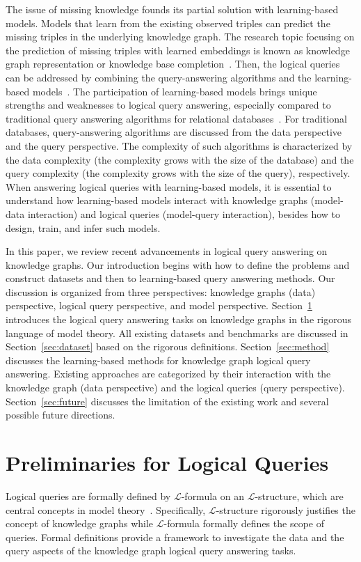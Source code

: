 \documentclass[11pt]{article}
\newcommand{\lang}{\mathcal{L}}
\begin{document}
The issue of missing knowledge founds its partial solution with learning-based models.
Models that learn from the existing observed triples can predict the missing triples in the underlying knowledge graph. The research topic focusing on the prediction of missing triples with learned embeddings is known as knowledge graph representation or knowledge base completion~\cite{Ji2022Surveyknowledge,Ruffinelli2020YouCAN}.
Then, the logical queries can be addressed by combining the query-answering algorithms and the learning-based models~\cite{Ren2020Query2boxReasoning,Kotnis2021AnsweringComplex,Daza2020MessagePassing}.
The participation of learning-based models brings unique strengths and weaknesses to logical query answering, especially compared to traditional query answering algorithms for relational databases~\cite{Ren2020Query2boxReasoning}. For traditional databases, query-answering algorithms are discussed from the data perspective and the query perspective. The complexity of such algorithms is characterized by the data complexity (the complexity grows with the size of the database) and the query complexity (the complexity grows with the size of the query), respectively.
When answering logical queries with learning-based models, it is essential to understand how learning-based models interact with knowledge graphs (model-data interaction) and logical queries (model-query interaction), besides how to design, train, and infer such models.

In this paper, we review recent advancements in logical query answering on knowledge graphs. Our introduction begins with how to define the problems and construct datasets and then to learning-based query answering methods. Our discussion is organized from three perspectives: knowledge graphs (data) perspective, logical query perspective, and model perspective.
Section~\ref{sec:data-query} introduces the logical query answering tasks on knowledge graphs in the rigorous language of model theory. All existing datasets and benchmarks are discussed in Section~\ref{sec:dataset} based on the rigorous definitions.
Section~\ref{sec:method} discusses the learning-based methods for knowledge graph logical query answering. Existing approaches are categorized by their interaction with the knowledge graph (data perspective) and the logical queries (query perspective).
Section~\ref{sec:future} discusses the limitation of the existing work and several possible future directions.

\section{Preliminaries for Logical Queries}\label{sec:data-query}
Logical queries are formally defined by $\lang$-formula on an $\lang$-structure, which are central concepts in model theory~\cite{Marker2002Modeltheory}. Specifically, $\lang$-structure rigorously justifies the concept of knowledge graphs while $\lang$-formula formally defines the scope of queries. Formal definitions provide a framework to investigate the data and the query aspects of the knowledge graph logical query answering tasks.
\end{document}
